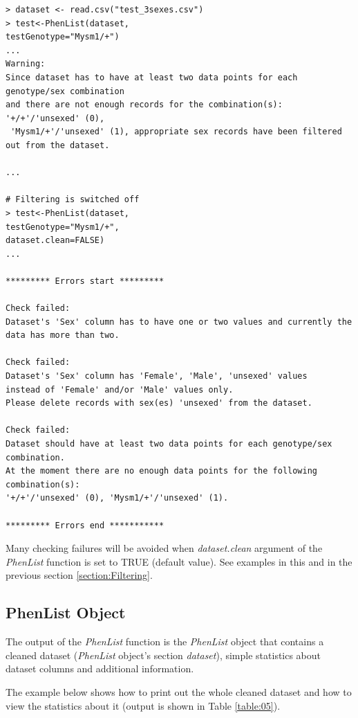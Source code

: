 \documentclass[12pt,a4paper]{article}
\begin{document}
\begingroup
    \fontsize{8pt}{12pt}\selectfont
\begin{verbatim}
> dataset <- read.csv("test_3sexes.csv")
> test<-PhenList(dataset,
testGenotype="Mysm1/+")
...
Warning:
Since dataset has to have at least two data points for each genotype/sex combination 
and there are not enough records for the combination(s): '+/+'/'unsexed' (0),
 'Mysm1/+'/'unsexed' (1), appropriate sex records have been filtered out from the dataset.

...

# Filtering is switched off
> test<-PhenList(dataset,
testGenotype="Mysm1/+",
dataset.clean=FALSE)
...

********* Errors start *********

Check failed:
Dataset's 'Sex' column has to have one or two values and currently the data has more than two.

Check failed:
Dataset's 'Sex' column has 'Female', 'Male', 'unsexed' values 
instead of 'Female' and/or 'Male' values only. 
Please delete records with sex(es) 'unsexed' from the dataset.

Check failed:
Dataset should have at least two data points for each genotype/sex combination. 
At the moment there are no enough data points for the following combination(s): 
'+/+'/'unsexed' (0), 'Mysm1/+'/'unsexed' (1).

********* Errors end ***********

\end{verbatim}
\endgroup

Many checking failures will be avoided when \textit{dataset.clean} argument of the \textit{PhenList} function is set to TRUE (default value). See examples in this and in the previous section \ref{section:Filtering}.

\subsection{PhenList Object}
The output of the \textit{PhenList} function is the \textit{PhenList} object that contains a cleaned dataset (\textit{PhenList} object's section \textit{dataset}), simple statistics about dataset columns and additional information. 

The example below shows how to print out the whole cleaned dataset and how to view the statistics about it (output is shown in Table \ref{table:05}). 
\end{document}
